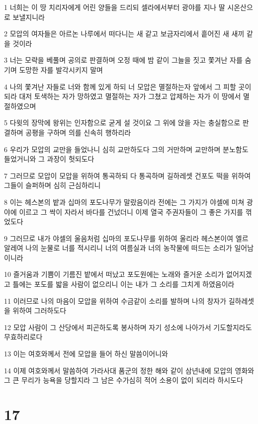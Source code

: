 \par 1 너희는 이 땅 치리자에게 어린 양들을 드리되 셀라에서부터 광야를 지나 딸 시온산으로 보낼지니라
\par 2 모압의 여자들은 아르논 나루에서 떠다니는 새 같고 보금자리에서 흩어진 새 새끼 같을 것이라
\par 3 너는 모략을 베풀며 공의로 판결하며 오정 때에 밤 같이 그늘을 짓고 쫓겨난 자를 숨기며 도망한 자를 발각시키지 말며
\par 4 나의 쫓겨난 자들로 너와 함께 있게 하되 너 모압은 멸절하는자 앞에서 그 피할 곳이 되라 대저 토색하는 자가 망하였고 멸절하는 자가 그쳤고 압제하는 자가 이 땅에서 멸절하였으며
\par 5 다윗의 장막에 왕위는 인자함으로 굳게 설 것이요 그 위에 앉을 자는 충실함으로 판결하며 공평을 구하며 의를 신속히 행하리라
\par 6 우리가 모압의 교만을 들었나니 심히 교만하도다 그의 거만하며 교만하며 분노함도 들었거니와 그 과장이 헛되도다
\par 7 그러므로 모압이 모압을 위하여 통곡하되 다 통곡하며 길하레셋 건포도 떡을 위하여 그들이 슬퍼하며 심히 근심하리니
\par 8 이는 헤스본의 밭과 십마의 포도나무가 말랐음이라 전에는 그 가지가 야셀에 미쳐 광야에 이르고 그 싹이 자라서 바다를 건넜더니 이제 열국 주권자들이 그 좋은 가지를 꺾었도다
\par 9 그러므로 내가 야셀의 울음처럼 십마의 포도나무를 위하여 울리라 헤스본이여 엘르알레여 나의 눈물로 너를 적시리니 너의 여름실과 너의 농작물에 떠드는 소리가 일어남이니라
\par 10 즐거움과 기쁨이 기름진 밭에서 떠났고 포도원에는 노래와 즐거운 소리가 없어지겠고 틀에는 포도를 밟을 사람이 없으리니 이는 내가 그 소리를 그치게 하였음이라
\par 11 이러므로 나의 마음이 모압을 위하여 수금같이 소리를 발하며 나의 창자가 길하레셋을 위하여 그러하도다
\par 12 모압 사람이 그 산당에서 피곤하도록 봉사하며 자기 성소에 나아가서 기도할지라도 무효하리로다
\par 13 이는 여호와께서 전에 모압을 들어 하신 말씀이어니와
\par 14 이제 여호와께서 말씀하여 가라사대 품군의 정한 해와 같이 삼년내에 모압의 영화와 그 큰 무리가 능욕을 당할지라 그 남은 수가심히 적어 소용이 없이 되리라 하시도다

\chapter{17}

